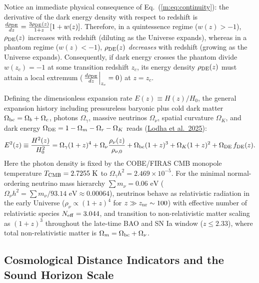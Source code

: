 \documentclass[aps,prd,preprint,superscriptaddress,nofootinbib]{revtex4-2}
\begin{document}
Notice an immediate physical consequence of Eq.~(\ref{m:eq:continuity}): the derivative of the dark energy density with respect to redshift is $\frac{d\rho_{\rm DE}}{dz} = \frac{3\rho_{\rm DE}(z)}{1+z}[1 + w(z)]$. Therefore, in a quintessence regime ($w(z) > -1$), $\rho_{\rm DE}(z)$ increases with redshift (diluting as the Universe expands), whereas in a phantom regime ($w(z) < -1$), $\rho_{\rm DE}(z)$ \emph{decreases} with redshift (growing as the Universe expands). Consequently, if dark energy crosses the phantom divide $w(z_c) = -1$ at some transition redshift $z_c$, its energy density $\rho_{\rm DE}(z)$ must attain a local extremum ($\left.\frac{d\rho_{\rm DE}}{dz}\right|_{z_c} = 0$) at $z = z_c$.

Defining the dimensionless expansion rate $E(z) \equiv H(z)/H_0$, the general expansion history including pressureless baryonic plus cold dark matter $\Omega_{\rm bc} = \Omega_b + \Omega_c$, photons $\Omega_\gamma$, massive neutrinos $\Omega_\nu$, spatial curvature $\Omega_K$, and dark energy $\Omega_{\rm DE} = 1 - \Omega_m - \Omega_r - \Omega_K$ reads (\href{https://arxiv.org/abs/2503.14743}{Lodha et al.\ 2025}):
\begin{equation}
    E^2(z) \equiv \frac{H^2(z)}{H_0^2} = \Omega_\gamma (1+z)^4 + \Omega_\nu \frac{\rho_\nu(z)}{\rho_{\nu,0}} + \Omega_{\rm bc}(1+z)^3 + \Omega_K(1+z)^2 + \Omega_{\rm DE}\, f_{\rm DE}(z).
    \label{m:eq:Ez_full}
\end{equation}
Here the photon density is fixed by the COBE/FIRAS CMB monopole temperature $T_{\rm CMB} = 2.7255\text{ K}$ to $\Omega_\gamma h^2 = 2.469 \times 10^{-5}$. For the minimal normal-ordering neutrino mass hierarchy $\sum m_\nu = 0.06\text{ eV}$ ($\Omega_\nu h^2 = \sum m_\nu / 93.14\text{ eV} \approx 0.00064$), neutrinos behave as relativistic radiation in the early Universe ($\rho_\nu \propto (1+z)^4$ for $z \gg z_{\rm nr} \sim 100$) with effective number of relativistic species $N_{\rm eff} = 3.044$, and transition to non-relativistic matter scaling as $(1+z)^3$ throughout the late-time BAO and SN Ia window ($z \le 2.33$), where total non-relativistic matter is $\Omega_m = \Omega_{\rm bc} + \Omega_\nu$.

\subsection{Cosmological Distance Indicators and the Sound Horizon Scale}
\end{document}
